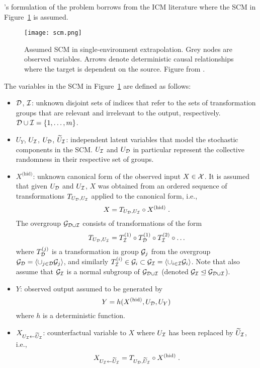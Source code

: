 \citeauthor{Mouli:2021}'s formulation of the problem borrows from the ICM literature \parencite{Parascandolo:2018} where the SCM in Figure~\ref{fig:scm} is assumed.
\begin{figure}[H]
\centering
\texttt{[image: scm.png]}
\caption{Assumed SCM in single-environment extrapolation. Grey nodes are observed variables. Arrows denote deterministic causal relationships where the target is dependent on the source. Figure from \parencite{Mouli:2021}.}
\label{fig:scm}
\end{figure}
\noindent The variables in the SCM in Figure~\ref{fig:scm} are defined as follows:
\begin{itemize}

\item
$\mathcal{D}$, $\mathcal{I}$: unknown disjoint sets of indices that refer to the sets of transformation groups that are relevant and irrelevant to the output, respectively. $\mathcal{D}\cup\mathcal{I}=\{1,\ldots,m\}$.

\item
$U_Y$, $U_{\mathcal{I}}$, $U_{\mathcal{D}}$, $\widetilde{U}_{\mathcal{I}}$: independent latent variables that model the stochastic components in the SCM. $U_{\mathcal{I}}$ and $U_{\mathcal{D}}$ in particular represent the collective randomness in their respective set of groups.

\item
$X^{\text{(hid)}}$: unknown canonical form of the observed input $X\in\mathcal{X}$.  It is assumed that given $U_{\mathcal{D}}$ and $U_{\mathcal{I}}$, $X$ was obtained from an ordered sequence of transformations $T_{U_{\mathcal{D}},U_{\mathcal{I}}}$ applied to the canonical form, i.e.,
\[
X=T_{U_{\mathcal{D}},U_{\mathcal{I}}}\circ X^{\text{(hid)}}\;.
\]
The overgroup $\mathcal{G}_{\mathcal{D}\cup\mathcal{I}}$ consists of transformations of the form
\[
T_{U_{\mathcal{D}},U_{\mathcal{I}}}=T_{\mathcal{I}}^{(1)}\circ T_{\mathcal{D}}^{(1)}\circ T_{\mathcal{I}}^{(2)}\circ\ldots
\]
where $T_{\mathcal{D}}^{(j)}$ is a transformation in group $\mathcal{G}_j$ from the overgroup $\mathcal{G}_{\mathcal{D}}=\langle\cup_{j\in\mathcal{D}}\mathcal{G}_j\rangle$, and similarly $T_{\mathcal{I}}^{(i)}\in\mathcal{G}_i\subset\mathcal{G}_{\mathcal{I}}=\langle\cup_{i\in\mathcal{I}}\mathcal{G}_i\rangle$. Note that \citeauthor{Mouli:2021} also assume that $\mathcal{G}_{\mathcal{I}}$ is a normal subgroup of $\mathcal{G}_{\mathcal{D}\cup\mathcal{I}}$ (denoted $\mathcal{G}_{\mathcal{I}}\trianglelefteq\mathcal{G}_{\mathcal{D}\cup\mathcal{I}}$).

\item
$Y$: observed output assumed to be generated by
\[
Y = h(X^{\text{(hid)}},U_{\mathcal{D}},U_Y)
\]
where $h$ is a deterministic function.

\item
$X_{U_{\mathcal{I}}\leftarrow\widetilde{U}_{\mathcal{I}}}$: counterfactual variable to $X$ where $U_{\mathcal{I}}$ has been replaced by $\widetilde{U}_{\mathcal{I}}$, i.e.,
\[
X_{U_{\mathcal{I}}\leftarrow\widetilde{U}_{\mathcal{I}}} = T_{U_{\mathcal{D}},\widetilde{U}_{\mathcal{I}}}\circ X^{\text{(hid)}} \;.
\]

\end{itemize}

